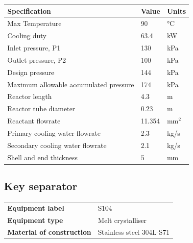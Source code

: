 \begin{table}[H]
\centering
\begin{tabular}{@{}l|l|l@{}}
\toprule
\textbf{Specification}                    & \textbf{Value} & \textbf{Units} \\ \midrule
Max Temperature                           & 90             & °C             \\ \midrule
Cooling duty                              & 63.4         & kW                \\ \midrule
Inlet   pressure, P1                      & 130        & kPa            \\ \midrule
Outlet   pressure, P2                     & 100            & kPa            \\ \midrule
Design   pressure                       & 144        & kPa            \\ \midrule
Maximum   allowable accumulated  pressure & 174        & kPa            \\ \midrule
Reactor length                            & 4.3          & m               \\ \midrule
Reactor tube diameter                            & 0.23          & m               \\ \midrule
Reactant flowrate                         & 11.354         & mm$^2$            \\ \midrule
Primary cooling water flowrate            & 2.3           & kg/s             \\ \midrule
Secondary cooling water flowrate          & 2.1         & kg/s            \\ \midrule
Shell and end thickness                   & 5         & mm            \\ \bottomrule
\end{tabular}
\end{table}
\newpage

\subsection{Key separator}

\begin{table}[H]
    \centering
    \begin{tabular}{@{}l|l@{}}
    \toprule
      \textbf{Equipment label}  & S104\\
       \textbf{Equipment type}  & Melt crystalliser \\
       \textbf{Material of construction} & Stainless steel 304L-S71 \\
       \bottomrule
    \end{tabular}
\end{table}


